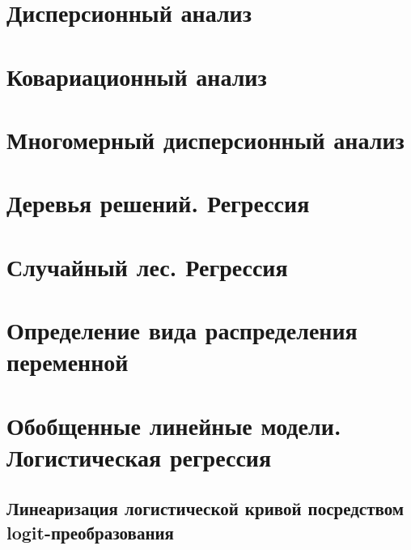 \documentclass[
  letterpaper,
  DIV=11,
  numbers=noendperiod]{scrreprt}
\theoremstyle{definition}
\theoremstyle{remark}
\begin{document}

\chapter{Дисперсионный анализ}\label{andan-anova}


\chapter{Ковариационный анализ}\label{andan-ancova}


\chapter{Многомерный дисперсионный анализ}\label{andan-manova}


\chapter{Деревья решений. Регрессия}\label{andan-treesreg}


\chapter{Случайный лес. Регрессия}\label{andan-randforestreg}


\chapter{Определение вида распределения
переменной}\label{andan-distributions}


\chapter{Обобщенные линейные модели. Логистическая
регрессия}\label{andan-logreg}

\section{Линеаризация логистической кривой посредством
logit-преобразования}\label{ux43bux438ux43dux435ux430ux440ux438ux437ux430ux446ux438ux44f-ux43bux43eux433ux438ux441ux442ux438ux447ux435ux441ux43aux43eux439-ux43aux440ux438ux432ux43eux439-ux43fux43eux441ux440ux435ux434ux441ux442ux432ux43eux43c-logit-ux43fux440ux435ux43eux431ux440ux430ux437ux43eux432ux430ux43dux438ux44f}
\end{document}
